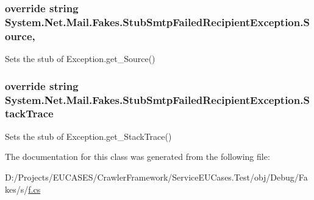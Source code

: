\hypertarget{class_system_1_1_net_1_1_mail_1_1_fakes_1_1_stub_smtp_failed_recipient_exception_a6806ecd6f7f72d27a44ee9a33fa72ae8}{
\subsubsection[{Source}]{\setlength{\rightskip}{0pt plus 5cm}override string System.\-Net.\-Mail.\-Fakes.\-Stub\-Smtp\-Failed\-Recipient\-Exception.\-Source\hspace{0.3cm}{\ttfamily [get]}, {\ttfamily [set]}}}\label{class_system_1_1_net_1_1_mail_1_1_fakes_1_1_stub_smtp_failed_recipient_exception_a6806ecd6f7f72d27a44ee9a33fa72ae8}


Sets the stub of Exception.\-get\-\_\-\-Source()

\hypertarget{class_system_1_1_net_1_1_mail_1_1_fakes_1_1_stub_smtp_failed_recipient_exception_aa54358a8921c6ffe9e651cb480e65c73}{
\subsubsection[{Stack\-Trace}]{\setlength{\rightskip}{0pt plus 5cm}override string System.\-Net.\-Mail.\-Fakes.\-Stub\-Smtp\-Failed\-Recipient\-Exception.\-Stack\-Trace\hspace{0.3cm}{\ttfamily [get]}}}\label{class_system_1_1_net_1_1_mail_1_1_fakes_1_1_stub_smtp_failed_recipient_exception_aa54358a8921c6ffe9e651cb480e65c73}


Sets the stub of Exception.\-get\-\_\-\-Stack\-Trace()



The documentation for this class was generated from the following file\-:\begin{DoxyCompactItemize}
\item 
D\-:/\-Projects/\-E\-U\-C\-A\-S\-E\-S/\-Crawler\-Framework/\-Service\-E\-U\-Cases.\-Test/obj/\-Debug/\-Fakes/s/\hyperlink{s_2f_8cs}{f.\-cs}\end{DoxyCompactItemize}
